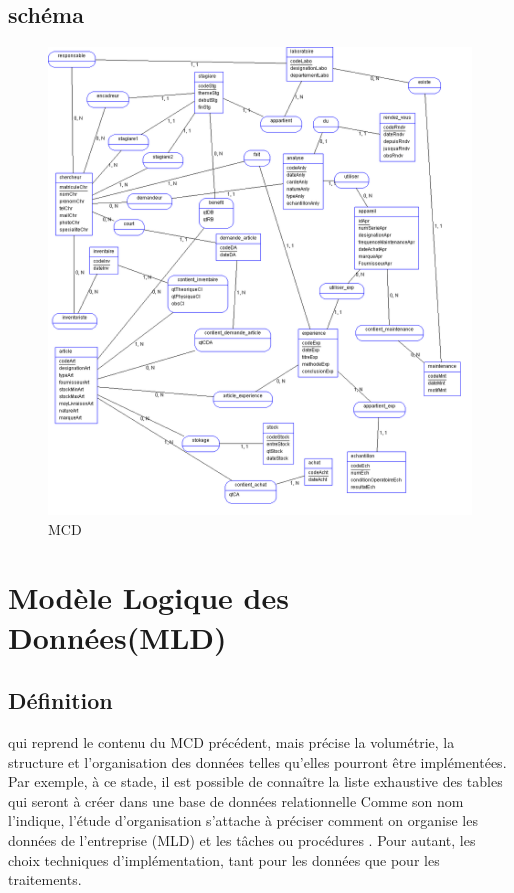 \subsection{schéma}
\begin{figure}[hbtp]
    \centering
    \includegraphics[width=.9\paperwidth]{images/mcd.png}
    \caption{MCD}
    \label{fig:MCD}
  \end{figure}
\newpage
\section{Modèle Logique des Données(MLD)}
\subsection{Définition}
qui reprend le contenu du MCD précédent, mais précise la volumétrie, la
structure et l'organisation des données telles qu'elles pourront être
implémentées. Par exemple, à ce stade, il est possible de connaître la liste
exhaustive des tables qui seront à créer dans une base de données relationnelle
Comme son nom l'indique, l'étude d’organisation s'attache à préciser comment
on organise les données de l'entreprise (MLD) et les tâches ou procédures .
Pour autant, les choix techniques d'implémentation, tant pour les données que
pour les traitements.
